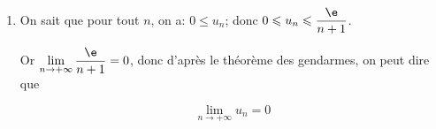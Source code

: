 \begin{enumerate}
\begin{enumerate}

$\aligned[t]
0 \leqslant  x \leqslant 1 
 &\implies  1-x  \leqslant 1 
\implies   \e^{1-x} \leqslant \e \text{~~~~(croissance de la fonction exponentielle)}\\
 &\implies   x^n \e^{1-x} \leqslant x^n\times \e ~~~~(x^n\geqslant 0)\\
 &\implies   \ds\int_{0}^{1} x^n \e^{1-x} \d x \leqslant \ds\int_{0}^{1}   x^n\times \e \d x \text{~~~~(craoissance de l'intégration)}\\
 &\implies   \ds\int_{0}^{1} x^n \e^{1-x} \d x \leqslant \e \ds\int_{0}^{1} x^n \d x
\implies   u_n \leqslant \e \left [ \dfrac{x^{n+1}}{n+1} \right ]_{0}^{1}\\
 & \implies   u_n \leqslant \dfrac{\e}{n+1} \\
\endaligned$

\item On sait que pour tout $n$, on a: $0\leqslant u_n$; donc $0\leqslant u_n \leqslant \dfrac{\e}{n+1}$.

Or  $\displaystyle\lim_{n \to + \infty} \dfrac{\e}{n+1} = 0$, donc d'après le théorème des gendarmes, on peut dire que  

\[\boxed{\displaystyle\lim_{n \to + \infty} u_n = 0}\]
	\end{enumerate}
\end{enumerate}


\bigskip

